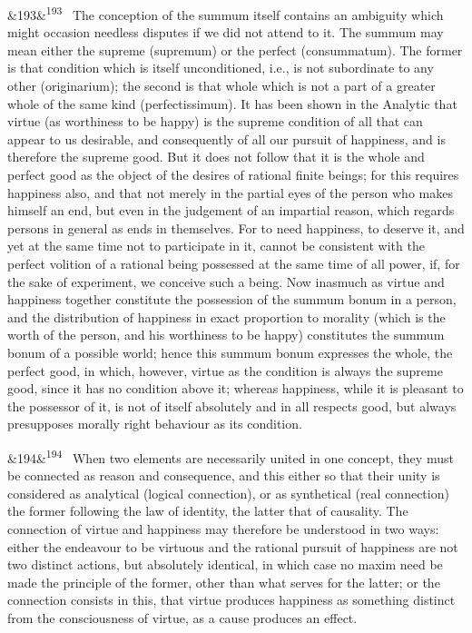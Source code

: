 \documentclass[12pt]{article}
\newcommand{\para}[1][]{\par\noindent\ifx&#1&\else\textsuperscript{\footnotesize #1}~\fi}
\begin{document}
\para[193] The conception of the summum itself contains an ambiguity which might occasion needless disputes if we did not attend to it. The summum may mean either the supreme (supremum) or the perfect (consummatum). The former is that condition which is itself unconditioned, i.e., is not subordinate to any other (originarium); the second is that whole which is not a part of a greater whole of the same kind (perfectissimum). It has been shown in the Analytic that virtue (as worthiness to be happy) is the supreme condition of all that can appear to us desirable, and consequently of all our pursuit of happiness, and is therefore the supreme good. But it does not follow that it is the whole and perfect good as the object of the desires of rational finite beings; for this requires happiness also, and that not merely in the partial eyes of the person who makes himself an end, but even in the judgement of an impartial reason, which regards persons in general as ends in themselves. For to need happiness, to deserve it, and yet at the same time not to participate in it, cannot be consistent with the perfect volition of a rational being possessed at the same time of all power, if, for the sake of experiment, we conceive such a being. Now inasmuch as virtue and happiness together constitute the possession of the summum bonum in a person, and the distribution of happiness in exact proportion to morality (which is the worth of the person, and his worthiness to be happy) constitutes the summum bonum of a possible world; hence this summum bonum expresses the whole, the perfect good, in which, however, virtue as the condition is always the supreme good, since it has no condition above it; whereas happiness, while it is pleasant to the possessor of it, is not of itself absolutely and in all respects good, but always presupposes morally right behaviour as its condition.

\para[194] When two elements are necessarily united in one concept, they must be connected as reason and consequence, and this either so that their unity is considered as analytical (logical connection), or as synthetical (real connection) the former following the law of identity, the latter that of causality. The connection of virtue and happiness may therefore be understood in two ways: either the endeavour to be virtuous and the rational pursuit of happiness are not two distinct actions, but absolutely identical, in which case no maxim need be made the principle of the former, other than what serves for the latter; or the connection consists in this, that virtue produces happiness as something distinct from the consciousness of virtue, as a cause produces an effect.
\end{document}
